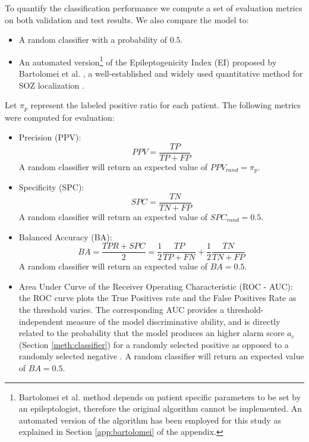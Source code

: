 To quantify the classification performance we compute a set of evaluation
metrics on both validation and test results. 
We also compare the model to:
\begin{itemize}
    \item A random classifier with a probability of $0.5$.
    \item An automated version\footnote{
    Bartolomei et al. method depends on patient specific parameters to be set by
    an epileptologist, therefore the original algorithm cannot be implemented.
    An automated version of the algorithm has been employed for this study as
    explained in Section \ref{app:bartolomei} of the appendix.
    } of the Epileptogenicity Index (EI) proposed by
    Bartolomei et al. \cite{bartolomei}, a well-established and widely used
    quantitative method for SOZ localization \cite{bartolomei-rev}.
\end{itemize}
Let $\pi_p$ represent the labeled positive ratio for each patient. 
The following metrics were computed for evaluation:
\begin{itemize}
    \item Precision (PPV):
    \begin{equation}
        PPV = \frac{TP}{TP + FP}
    \end{equation}
    A random classifier will return an expected value of $PPV_{rand}=\pi_p$. 
 
    \item Specificity (SPC):
    \begin{equation}
        SPC = \frac{TN}{TN + FP}
    \end{equation}
    A random classifier will return an expected value of $SPC_{rand}=0.5$. 
    
    \item Balanced Accuracy (BA):
    \begin{equation}
        BA = \frac{TPR + SPC}{2}=
        \frac{1}{2}\frac{TP}{TP + FN}+\frac{1}{2}\frac{TN}{TN + FP}
    \end{equation} 
    A random classifier will return an expected value of $BA=0.5$.

    \item Area Under Curve of the Receiver Operating Characteristic (ROC - AUC):
    the ROC curve plots the True Positives rate and the False Positives Rate
    as the threshold varies. 
    The corresponding AUC provides a threshold-independent measure of the 
    model discriminative ability, and is directly related to the
    probability that the model produces an higher alarm score $a_c$
    (Section \ref{meth:classifier}) for a randomly selected positive as opposed 
    to a randomly selected negative \cite{rocauc}. 
    A random classifier will return an expected value of $BA=0.5$.
\end{itemize}














 